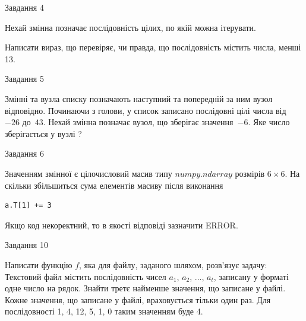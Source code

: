 \documentclass[12pt, ukrainian]{article}
\begin{document}
{\begin{minipage}[t]{8.0cm}
\end{minipage}


               
{\begin{center}Завдання {4}\end{center}}
\vspace{-4mm}
Нехай змінна  позначає послідовність цілих, по якій можна ітерувати.

Написати вираз, що перевіряє, чи правда, що послідовність  містить числа, менші 13.\par

\vspace{10mm}
               
{\begin{center}Завдання {5}\end{center}}
\vspace{-4mm}
Змінні  та  вузла списку позначають наступний та попередній за ним вузол відповідно. Починаючи з голови, у список записано послідовні цілі числа від~$-26$ до~$43$. Нехай змінна  позначає вузол, що зберігає значення~$-6$.
Яке число зберігається у вузлі  ?\par

               
{\begin{center}Завдання {6}\end{center}}
\vspace{-4mm}
Значенням змінної  є цілочисловий масив типу $numpy.ndarray$ розмірів $6{\times}6$. На скільки збільшиться сума елементів масиву  після виконання
\begin{verbatim}
a.T[1] += 3
\end{verbatim}


Якщо код некоректний, то в якості відповіді зазначити ERROR.\par

               
{\begin{center}Завдання {10}\end{center}}
\vspace{-4mm}

Написати функцію $f$, яка для файлу, заданого шляхом, розв’язує задачу:\\ Текстовий файл містить послідовність чисел $a_1$, $a_2$, $\ldots$, $a_t$, записану у форматі одне число на рядок. Знайти третє найменше значення, що записане у файлі. Кожне значення, що записане у файлі, враховується тільки один раз. Для послідовності 1, 4, 12, 5, 1, 0 таким значенням буде 4.

}
\end{document}
